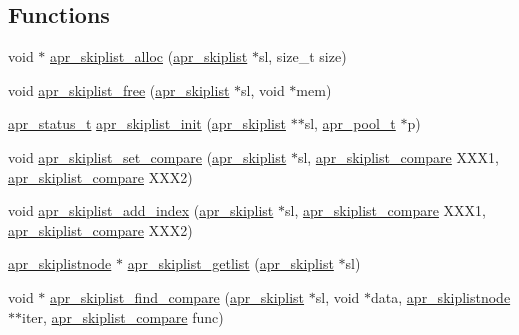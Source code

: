 \subsection*{Functions}
\begin{DoxyCompactItemize}
\item 
void $\ast$ \hyperlink{group__apr__skiplist_ga42fd4de5a4239c988c3d57f88bd685d6}{apr\+\_\+skiplist\+\_\+alloc} (\hyperlink{group__apr__skiplist_gac79ddf14bb5cb5b6d35961309eadec48}{apr\+\_\+skiplist} $\ast$sl, size\+\_\+t size)
\item 
void \hyperlink{group__apr__skiplist_ga9e799684f45cc8a1b673cc99ca935f2b}{apr\+\_\+skiplist\+\_\+free} (\hyperlink{group__apr__skiplist_gac79ddf14bb5cb5b6d35961309eadec48}{apr\+\_\+skiplist} $\ast$sl, void $\ast$mem)
\item 
\hyperlink{group__apr__errno_gaf76ee4543247e9fb3f3546203e590a6c}{apr\+\_\+status\+\_\+t} \hyperlink{group__apr__skiplist_ga53f636612f9d82ef2886a85d33c704ed}{apr\+\_\+skiplist\+\_\+init} (\hyperlink{group__apr__skiplist_gac79ddf14bb5cb5b6d35961309eadec48}{apr\+\_\+skiplist} $\ast$$\ast$sl, \hyperlink{group__apr__pools_gaf137f28edcf9a086cd6bc36c20d7cdfb}{apr\+\_\+pool\+\_\+t} $\ast$p)
\item 
void \hyperlink{group__apr__skiplist_ga61bebe90df16a4ea8a6ab6c6b6792e4a}{apr\+\_\+skiplist\+\_\+set\+\_\+compare} (\hyperlink{group__apr__skiplist_gac79ddf14bb5cb5b6d35961309eadec48}{apr\+\_\+skiplist} $\ast$sl, \hyperlink{group__apr__skiplist_ga873aa114e692e48c6587277680ceba87}{apr\+\_\+skiplist\+\_\+compare} X\+X\+X1, \hyperlink{group__apr__skiplist_ga873aa114e692e48c6587277680ceba87}{apr\+\_\+skiplist\+\_\+compare} X\+X\+X2)
\item 
void \hyperlink{group__apr__skiplist_ga7f9e8bd8d1900d64c82ca5c9113621a8}{apr\+\_\+skiplist\+\_\+add\+\_\+index} (\hyperlink{group__apr__skiplist_gac79ddf14bb5cb5b6d35961309eadec48}{apr\+\_\+skiplist} $\ast$sl, \hyperlink{group__apr__skiplist_ga873aa114e692e48c6587277680ceba87}{apr\+\_\+skiplist\+\_\+compare} X\+X\+X1, \hyperlink{group__apr__skiplist_ga873aa114e692e48c6587277680ceba87}{apr\+\_\+skiplist\+\_\+compare} X\+X\+X2)
\item 
\hyperlink{group__apr__skiplist_gafb934f577d03de823aa4d62b41399bc0}{apr\+\_\+skiplistnode} $\ast$ \hyperlink{group__apr__skiplist_ga2a4515bc1a4174fde279c2edc5dd2593}{apr\+\_\+skiplist\+\_\+getlist} (\hyperlink{group__apr__skiplist_gac79ddf14bb5cb5b6d35961309eadec48}{apr\+\_\+skiplist} $\ast$sl)
\item 
void $\ast$ \hyperlink{group__apr__skiplist_gac1dc196aa51b1370cdc41e6258c36d7c}{apr\+\_\+skiplist\+\_\+find\+\_\+compare} (\hyperlink{group__apr__skiplist_gac79ddf14bb5cb5b6d35961309eadec48}{apr\+\_\+skiplist} $\ast$sl, void $\ast$data, \hyperlink{group__apr__skiplist_gafb934f577d03de823aa4d62b41399bc0}{apr\+\_\+skiplistnode} $\ast$$\ast$iter, \hyperlink{group__apr__skiplist_ga873aa114e692e48c6587277680ceba87}{apr\+\_\+skiplist\+\_\+compare} func)

\end{DoxyCompactItemize}
